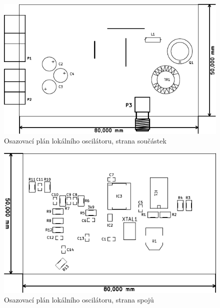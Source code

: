 \begin{figure}[H]
	\centering
	\includegraphics[width=160mm]{img/lo/os_f.pdf}
	\caption{Osazovací plán lokálního oscilátoru, strana součástek}    		
\end{figure}

\begin{figure}[H]
	\centering
	\includegraphics[width=120mm]{img/lo/os_b.pdf}
	\caption{Osazovací plán lokálního oscilátoru, strana spojů}    		
\end{figure}

